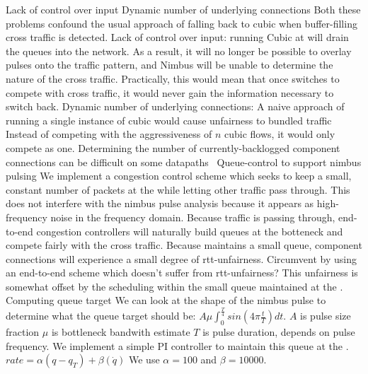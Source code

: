 \begin{outline}
        \3 Lack of control over input
        \3 Dynamic number of underlying connections 
    \2 Both these problems confound the usual approach of falling back to cubic when buffer-filling cross traffic is detected.
        \3 Lack of control over input: running Cubic at \inbox will drain the queues into the network. As a result, it will no longer be possible to overlay pulses onto the traffic pattern, and Nimbus will be unable to determine the nature of the cross traffic.
            \4 Practically, this would mean that once \inbox switches to compete with cross traffic, it would never gain the information necessary to switch back.
        \3 Dynamic number of underlying connections: A naive approach of running a single instance of cubic would cause unfairness to bundled traffic
            \4 Instead of competing with the aggressiveness of $n$ cubic flows, it would only compete as one.
            \4 Determining the number of currently-backlogged component connections can be difficult on some datapaths~\cite{heavy-hitters} 
\1 Queue-control to support nimbus pulsing
    \2 We implement a congestion control scheme which seeks to keep a small, constant number of packets at the \inbox while letting other traffic pass through.
        \3 This does not interfere with the nimbus pulse analysis because it appears as high-frequency noise in the frequency domain. 
        \3 Because traffic is passing through, end-to-end congestion controllers will naturally build queues at the botteneck and compete fairly with the cross traffic.
        \3 Because \inbox maintains a small queue, component connections will experience a small degree of rtt-unfairness.
            \4 Circumvent by using an end-to-end scheme which doesn't suffer from rtt-unfairness?
        \3 This unfairness is somewhat offset by the scheduling within the small queue maintained at the \inbox. 
\1 Computing \inbox queue target
    \2 We can look at the shape of the nimbus pulse to determine what the queue target should be: $A \mu \int_0^{\frac{T}{4}} sin(4 \pi \frac{t}{T}) dt$.
        \3 $A$ is pulse size fraction
        \3 $\mu$ is bottleneck bandwith estimate
        \3 $T$ is pulse duration, depends on pulse frequency.
\1 We implement a simple PI controller to maintain this queue at the \inbox.
    \2 $rate = \alpha (q - q_T) + \beta (\dot{q})$
        \3 We use $\alpha = 100$ and $\beta = 10000$.
    \2 
\end{outline}
